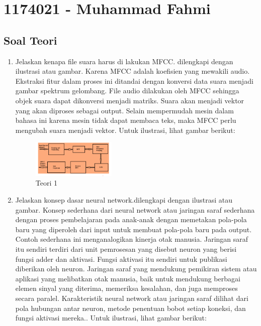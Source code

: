 \section{1174021 - Muhammad Fahmi}
\subsection{Soal Teori}
\begin{enumerate}

	\item Jelaskan kenapa file suara harus di lakukan MFCC. dilengkapi dengan ilustrasi atau gambar.
	\hfill\break
	Karena MFCC adalah koefisien yang mewakili audio. Ekstraksi fitur dalam proses ini ditandai dengan konversi data suara menjadi gambar spektrum gelombang. File audio dilakukan oleh MFCC sehingga objek suara dapat dikonversi menjadi matriks. Suara akan menjadi vektor yang akan diproses sebagai output. Selain mempermudah mesin dalam bahasa ini karena mesin tidak dapat membaca teks, maka MFCC perlu mengubah suara menjadi vektor. Untuk ilustrasi, lihat gambar berikut: 

	\begin{figure}[H]
	\centering
		\includegraphics[width=4cm]{figures/1174021/tugas6/materi/teori1.PNG}
		\caption{Teori 1}
	\end{figure}

	\item Jelaskan konsep dasar neural network.dilengkapi dengan ilustrasi atau gambar.
	\hfill\break
	Konsep sederhana dari neural network atau jaringan saraf sederhana dengan proses pembelajaran pada anak-anak dengan memetakan pola-pola baru yang diperoleh dari input untuk membuat pola-pola baru pada output. Contoh sederhana ini menganalogikan kinerja otak manusia. Jaringan saraf itu sendiri terdiri dari unit pemrosesan yang disebut neuron yang berisi fungsi adder dan aktivasi. Fungsi aktivasi itu sendiri untuk publikasi diberikan oleh neuron. Jaringan saraf yang mendukung pemikiran sistem atau aplikasi yang melibatkan otak manusia, baik untuk mendukung berbagai elemen sinyal yang diterima, memeriksa kesalahan, dan juga memproses secara paralel. Karakteristik neural network atau jaringan saraf dilihat dari pola hubungan antar neuron, metode penentuan bobot setiap koneksi, dan fungsi aktivasi mereka.. Untuk ilustrasi, lihat gambar berikut: 


\end{enumerate}
